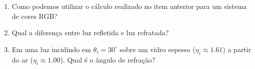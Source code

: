 \documentclass[12pt,a4paper]{article}
\begin{document}
\begin{enumerate}
	\item Como podemos utilizar o cálculo realizado no item anterior para um sistema de cores RGB?
	
	\item Qual a diferença entre luz refletida e luz refratada?
	
	\item Em uma luz incidindo em $\theta_i = 30^\circ$ sobre um vidro espesso ($\eta_i \approx 1.61$) a partir do ar ($\eta_i \approx 1.00$). Qual  é o ângulo de refração?


\end{enumerate}
\end{document}
